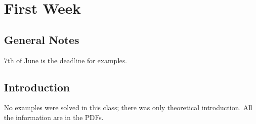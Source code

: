 \section{First Week}
\subsection{General Notes}
7th of June is the deadline for examples.

\subsection{Introduction}
No examples were solved in this class; there was only theoretical introduction. All the information are in the PDFs.

